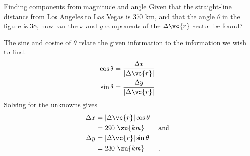 \begin{eg}{Finding components from magnitude and angle}\label{eg:la-vegas-components}
\egquestion Given that the straight-line distance from Los
Angeles to Las Vegas is 370 km, and that the angle $\theta $
in the figure is 38\degunit, how can the $x$ and $y$ components of
the $\Delta \vc{r}$ vector be found?

\eganswer The sine and cosine of $\theta $ relate the given
information to the information we wish to find:
\begin{align*}
        \cos  \theta      &=  \frac{\Delta x}{|\Delta\vc{r}|}  \\
        \sin  \theta      &=  \frac{\Delta y}{|\Delta\vc{r}|}  
\end{align*}
Solving for the unknowns gives
\begin{align*}
        \Delta x     &= |\Delta\vc{r}|\cos\theta   \\
             &=  290\ \zu{km}  \qquad \text{and}\\
        \Delta y     &= |\Delta\vc{r}|\sin\theta   \\
             &=  230\ \zu{km}  \qquad .
\end{align*}
\end{eg}

